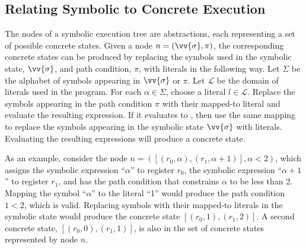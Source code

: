 



\subsection{Relating Symbolic to Concrete Execution}
The nodes of a symbolic execution tree are abstractions, each representing a set
of possible concrete states. Given a node $n=(\vv{\sigma},\pi)$, the corresponding
concrete states can be produced by replacing the symbols used in the symbolic state,
$\vv{\sigma}$, and path condition, $\pi$, with literals in the
following way. Let $\Sigma$ be the alphabet of symbols appearing in $\vv{\sigma}$
or $\pi$. Let $\mathcal{L}$ be the domain of literals used in the program. For
each $\alpha \in \Sigma$, choose a literal $l \in \mathcal{L}$. Replace the
symbols appearing in the path condition $\pi$ with their mapped-to literal and
evaluate the resulting expression. If it evaluates to \texttrue, then
use the same mapping to replace the symbols appearing in the symbolic state
$\vv{\sigma}$ with literals. Evaluating the resulting expressions will produce a
concrete state.

As an example, consider the node $n=([(r_0,\alpha), (r_1,\alpha+1)], \alpha < 2)$,
which assigns the symbolic expression
``$\alpha$'' to register $r_0$, the symbolic expression ``$\alpha+1$'' to
register $r_1$, and has the path condition that constrains $\alpha$ to be less
than 2. Mapping the symbol ``$\alpha$'' to the literal ``1'' would produce the
path condition $1 < 2$, which is valid. Replacing symbols with their mapped-to
literals in the symbolic state would produce the concrete state $[(r_0,1),
(r_1,2)]$. A second concrete state, $[(r_0,0),(r_1,1)]$, is also in the set of
concrete states represented by node $n$.


